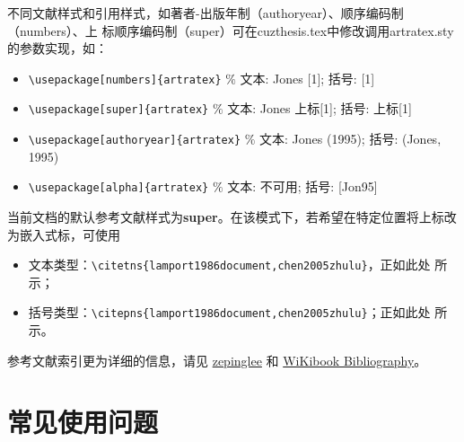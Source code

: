 不同文献样式和引用样式，如著者-出版年制（authoryear）、顺序编码制（numbers）、上
标顺序编码制（super）可在cuzthesis.tex中修改调用artratex.sty的参数实现，如：
\begin{itemize}
    \item \verb+\usepackage[numbers]{artratex}+ $\%$ 文本: Jones [1]; 括号: [1]
    \item \verb+\usepackage[super]{artratex}+ $\%$ 文本: Jones 上标[1]; 括号: 上标[1]
    \item \verb+\usepackage[authoryear]{artratex}+ $\%$ 文本: Jones (1995); 括号: (Jones, 1995)
    \item \verb+\usepackage[alpha]{artratex}+ $\%$ 文本: 不可用; 括号: [Jon95]
\end{itemize}

当前文档的默认参考文献样式为\textbf{super}。在该模式下，若希望在特定位置将上标改
为嵌入式标，可使用

\begin{itemize}
    \item 文本类型：\verb|\citetns{lamport1986document,chen2005zhulu}|，正如此处
    所示；
    \item 括号类型：\verb|\citepns{lamport1986document,chen2005zhulu}|；正如此处
    所示。
\end{itemize}

参考文献索引更为详细的信息，请见
\href{https://github.com/zepinglee/gbt7714-bibtex-style}{zepinglee} 和
\href{https://en.wikibooks.org/wiki/LaTeX/Bibliography_Management}{WiKibook
Bibliography}。

\nocite{*}

\section{常见使用问题}\label{sec:qa}

